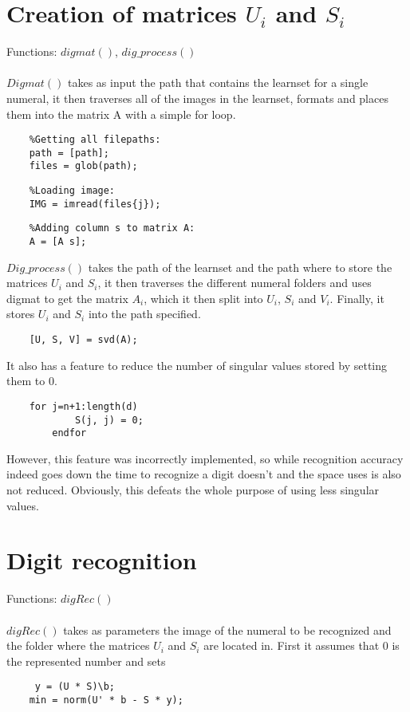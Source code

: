 \documentclass{article}
\begin{document}
	\section{Creation of matrices $U_i$ and $S_i$}
	Functions: $digmat()$, $dig\_process()$
	
	\paragraph{}
	$Digmat()$ takes as input the path that contains the learnset for a single numeral, it then traverses all of the images in the learnset, formats and places them into the matrix A with a simple for loop.
	\begin{lstlisting}
	%Getting all filepaths:
	path = [path];
	files = glob(path);
	\end{lstlisting}
	\begin{lstlisting}
	%Loading image:
	IMG = imread(files{j});
	\end{lstlisting}
	\begin{lstlisting}
	%Adding column s to matrix A:
	A = [A s];
	\end{lstlisting}
	$Dig\_process()$ takes the path of the learnset and the path where to store the matrices $U_i$ and $S_i$, it then traverses the different numeral folders and uses digmat to get the matrix $A_i$, which it then split into $U_i$, $S_i$ and $V_i$.
	 Finally, it stores $U_i$ and $S_i$ into the path specified.
	\begin{lstlisting}
	[U, S, V] = svd(A);
	\end{lstlisting}
	It also has a feature to reduce the number of singular values stored by setting them to 0.
	\begin{lstlisting}
	for j=n+1:length(d)
      		S(j, j) = 0;
    	endfor 
	\end{lstlisting}
	However, this feature was incorrectly implemented, so while recognition accuracy indeed goes down the time to recognize a digit doesn’t and the space uses is also not reduced. Obviously, this defeats the whole purpose of using less singular values.
	
	\section{Digit recognition}
	Functions: $digRec()$
	
	\paragraph{}
	$digRec()$ takes as parameters the image of the numeral to be recognized and the folder where the matrices $U_i$ and $S_i$ are located in. 
	First it assumes that 0 is the represented number and sets 
	\begin{lstlisting}
	 y = (U * S)\b;
 	min = norm(U' * b - S * y); 
	\end{lstlisting}
	
\end{document}
